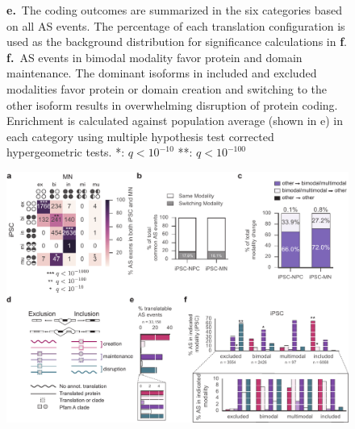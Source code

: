 \begin{figure}[h]
{\textbf{e.}~The coding outcomes are summarized in the six categories based on all AS events. The percentage of each translation configuration is used as the background distribution for significance calculations in \textbf{f}.\\
\textbf{f.}~AS events in bimodal modality favor protein and domain maintenance. The dominant isoforms in included and excluded modalities favor protein or domain creation and switching to the other isoform results in overwhelming disruption of protein coding. Enrichment is calculated against population average (shown in e) in each category using multiple hypothesis test corrected hypergeometric tests. *: $q< 10^{-10}$  **: $q< 10^{-100}$
}
\label{fig:dynamic_modalities}
\end{figure}
\clearpage
\begin{figure}[h]
\ContinuedFloat
\captionsetup{labelformat=empty}
\centering
\includegraphics[width=5.8in]{figures/dynamic_modalities.pdf}
\end{figure}
\clearpage


